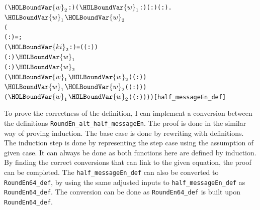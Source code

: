 \documentclass{article}
\begin{document}
\begin{alltt}
\HOLTokenTurnstile{} \HOLSymConst{\HOLTokenForall{}}(\ensuremath{\HOLBoundVar{w}\sb{\mathrm{2}}} :) (\ensuremath{\HOLBoundVar{w}\sb{\mathrm{1}}} :) ( :) ( : ).
      \ensuremath{\HOLBoundVar{w}\sb{\mathrm{1}}} \ensuremath{\HOLBoundVar{w}\sb{\mathrm{2}}}   \HOLSymConst{=}
     (
        ( :) =   ;
        (\ensuremath{\HOLBoundVar{ki}\sb{\mathrm{2}}} :) =  ( \HOLSymConst{\ensuremath{-}} ( :)) 
          \HOLSymConst{=} ( :)  \ensuremath{\HOLBoundVar{w}\sb{\mathrm{1}}}
           \HOLSymConst{=} ( :)  \ensuremath{\HOLBoundVar{w}\sb{\mathrm{2}}}
          ( \ensuremath{\HOLBoundVar{w}\sb{\mathrm{1}}} \ensuremath{\HOLBoundVar{w}\sb{\mathrm{2}}}  ( \HOLSymConst{\ensuremath{-}} ( :)) \HOLSymConst{\HOLTokenEor{}}
            \ensuremath{\HOLBoundVar{w}\sb{\mathrm{1}}} \ensuremath{\HOLBoundVar{w}\sb{\mathrm{2}}}  ( \HOLSymConst{\ensuremath{-}} ( :))) \HOLSymConst{\HOLTokenRol{}}
           ( \ensuremath{\HOLBoundVar{w}\sb{\mathrm{1}}} \ensuremath{\HOLBoundVar{w}\sb{\mathrm{2}}}  ( \HOLSymConst{\ensuremath{-}} ( :))) \HOLSymConst{\ensuremath{+}} )\hfill{[half_messageEn_def]}
\end{alltt}

To prove the correctness of the definition, I can implement a conversion between the definitions \verb|RoundEn_alt_half_messageEn|.
The proof is done in the similar way of proving induction. The base case is done by rewriting with definitions. The induction step is
done by representing the step case using the assumption of given case. It can always be done as both functions here are defined by
induction. By finding the correct conversions that can link to the given equation, the proof can be completed.
The \verb|half_messageEn_def| can also be converted to \verb|RoundEn64_def|, by using the same adjusted inputs to \verb|half_messageEn_def|
as \verb|RoundEn64_def|. The conversion can be done as \verb|RoundEn64_def| is built upon \verb|RoundEn64_def|.
\end{document}
